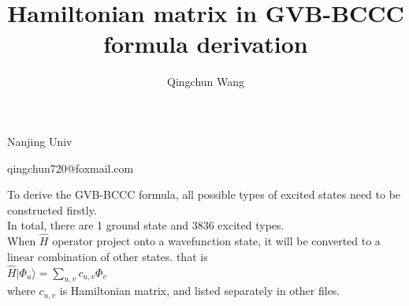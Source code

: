 \documentclass[14pt]{article}
\begin{document}
    \title{Hamiltonian matrix in GVB-BCCC formula derivation}
    \author{Qingchun Wang}
    \maketitle
    \centerline{Nanjing Univ}
    \centerline{qingchun720@foxmail.com}
    
    \linespread{2.0}\selectfont
    \thispagestyle{empty}
    
    \newpage
    \setlength{\parindent}{0pt}
    \setcounter{page}{1}
    
    To derive the GVB-BCCC formula, all possible types of excited states need to be constructed firstly. \\ 
    In total, there are 1 ground state and 3836 excited types. \\ 
    
    When $\hat{H}$ operator project onto a wavefunction state, it will be converted to a linear combination of other states. that is \\ 
    $\hat{H}\vert{\Phi_{u}}\rangle = \displaystyle\sum_{u,v}{c_{u,v}\Phi_{v}}$ \\ 
    where $c_{u,v} $ is Hamiltonian matrix, and listed separately in other files.\\ 
    
\end{document}
